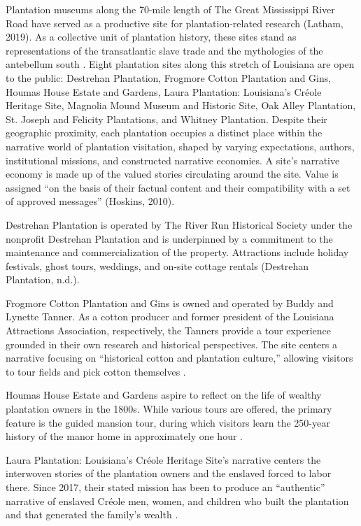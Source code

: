 \documentclass[final]{anthology-ch} %
\begin{document}
Plantation museums along the 70-mile length of The Great Mississippi River Road have served as a productive site for plantation-related research \cite{alderman2016political, bright2016who, carter2014house, carter2016where, harnay2022slavery} (Latham, 2019). As a collective unit of plantation history, these sites stand as representations of the transatlantic slave trade and the mythologies of the antebellum south \cite{modlin2008tales}. Eight plantation sites along this stretch of Louisiana are open to the public: Destrehan Plantation, Frogmore Cotton Plantation and Gins, Houmas House Estate and Gardens, Laura Plantation: Louisiana's Créole Heritage Site, Magnolia Mound Museum and Historic Site, Oak Alley Plantation, St. Joseph and Felicity Plantations, and Whitney Plantation. Despite their geographic proximity, each plantation occupies a distinct place within the narrative world of plantation visitation, shaped by varying expectations, authors, institutional missions, and constructed narrative economies. A site's narrative economy is made up of the valued stories circulating around the site. Value is assigned \enquote{on the basis of their factual content and their compatibility with a set of approved messages} (Hoskins, 2010).

Destrehan Plantation is operated by The River Run Historical Society under the nonprofit Destrehan Plantation and is underpinned by a commitment to the maintenance and commercialization of the property. Attractions include holiday festivals, ghost tours, weddings, and on-site cottage rentals (Destrehan Plantation, n.d.).

Frogmore Cotton Plantation and Gins is owned and operated by Buddy and Lynette Tanner. As a cotton producer and former president of the Louisiana Attractions Association, respectively, the Tanners provide a tour experience grounded in their own research and historical perspectives. The site centers a narrative focusing on \enquote{historical cotton and plantation culture,} allowing visitors to tour fields and pick cotton themselves \cite{frogmore}.

Houmas House Estate and Gardens aspire to reflect on the life of wealthy plantation owners in the 1800s. While various tours are offered, the primary feature is the guided mansion tour, during which visitors learn the 250-year history of the manor home in approximately one hour \cite{houmashouse}.

Laura Plantation: Louisiana's Créole Heritage Site's narrative centers the interwoven stories of the plantation owners and the enslaved forced to labor there. Since 2017, their stated mission has been to produce an \enquote{authentic} narrative of enslaved Créole men, women, and children who built the plantation and that generated the family's wealth \cite{lauraplantation}.
\end{document}
